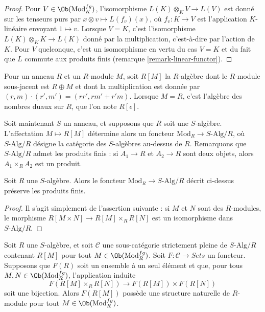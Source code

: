 \begin{proof}
Pour $V \in \Ob(\text{Mod}^{fg}_K)$, l'isomorphisme
$L(K) \otimes_K V \to L(V)$ est donné sur les tenseurs purs par
$x \otimes v \mapsto L(f_v)(x)$, où $f_v: K \to V$ est l'application
$K$-linéaire envoyant $1 \mapsto v$. Lorsque $V = K$, c'est l'isomorphisme
$L(K) \otimes_K K \to L(K)$ donné par la multiplication, c'est-à-dire par
l'action de $K$. Pour $V$
quelconque, c'est un isomorphisme en vertu du cas $V = K$ et du fait que $L$
commute aux produits finis (remarque \ref{remark-linear-functor}).
\end{proof}

\noindent
Pour un anneau $R$ et un $R$-module $M$, soit $R[M]$ la $R$-algèbre dont le
$R$-module sous-jacent est $R \oplus M$ et dont la multiplication est donnée
par $(r, m) \cdot (r', m') = (rr', rm' + r'm)$. Lorsque $M = R$, c'est
l'algèbre des nombres duaux sur $R$, que l'on note $R[\epsilon]$.

\medskip\noindent
Soit maintenant $S$ un anneau, et supposons que $R$ soit une $S$-algèbre.
L'affectation $M \mapsto R[M]$ détermine alors un foncteur
$\text{Mod}_R \to S\text{-Alg}/R$, où $S\text{-Alg}/R$ désigne la catégorie
des $S$-algèbres au-dessus de $R$. Remarquons que $S\text{-Alg}/R$ admet les
produits finis : si $A_1 \to R$ et $A_2 \to R$ sont deux objets, alors
$A_1 \times_R A_2$ est un produit.

\begin{lemma}
\label{lemma-preserves-products}
Soit $R$ une $S$-algèbre. Alors le foncteur
$\text{Mod}_R \to S\text{-Alg}/R$ décrit ci-dessus préserve les produits
finis.
\end{lemma}

\begin{proof}
Il s'agit simplement de l'assertion suivante : si $M$ et $N$ sont des
$R$-modules, le morphisme $R[M \times N] \to R[M] \times_R R[N]$ est un
isomorphisme dans $S\text{-Alg}/R$.
\end{proof}

\begin{lemma}
\label{lemma-tangent-space-functor}
Soit $R$ une $S$-algèbre, et soit $\mathcal{C}$ une sous-catégorie strictement
pleine de $S\text{-Alg}/R$ contenant $R[M]$ pour tout
$M \in \Ob(\text{Mod}^{fg}_R)$. Soit
$F: \mathcal{C} \to \textit{Sets}$ un foncteur. Supposons que $F(R)$ soit un
ensemble à un seul élément et que, pour tous $M, N \in
\Ob(\text{Mod}^{fg}_R)$, l'application
induite
$$
F(R[M] \times_R R[N]) \to F(R[M]) \times F(R[N])
$$
soit une bijection. Alors $F(R[M])$ possède une structure naturelle de
$R$-module pour tout $M
\in \Ob(\text{Mod}^{fg}_R)$.
\end{lemma}


